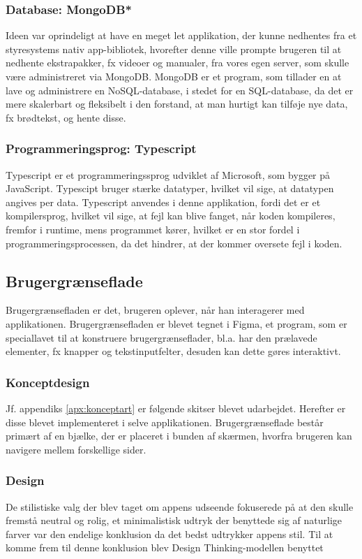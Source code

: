 \subsubsection{Database: MongoDB*}
Ideen var oprindeligt at have en meget let applikation, der kunne nedhentes fra et styresystems nativ app-bibliotek, hvorefter denne ville prompte brugeren til at nedhente ekstrapakker, fx videoer og manualer, fra vores egen server, som skulle være administreret via MongoDB. MongoDB er et program, som tillader en at lave og administrere en NoSQL-database, i stedet for en SQL-database, da det er mere skalerbart og fleksibelt i den forstand, at man hurtigt kan tilføje nye data, fx brødtekst, og hente disse. 
\subsubsection{Programmeringsprog: Typescript}
Typescript er et programmeringssprog udviklet af Microsoft, som bygger på JavaScript. Typescipt bruger stærke datatyper, hvilket vil sige, at datatypen angives per data. Typescript anvendes i denne applikation, fordi det er et kompilersprog, hvilket vil sige, at fejl kan blive fanget, når koden kompileres, fremfor i runtime, mens programmet kører, hvilket er en stor fordel i programmeringsprocessen, da det hindrer, at der kommer oversete fejl i koden.
\subsection{Brugergrænseflade}
Brugergrænsefladen er det, brugeren oplever, når han interagerer med applikationen. Brugergrænsefladen er blevet tegnet i Figma, et program, som er speciallavet til at konstruere brugergrænseflader, bl.a. har den prælavede elementer, fx knapper og tekstinputfelter, desuden kan dette gøres interaktivt. 
\subsubsection{Konceptdesign}
Jf. appendiks \ref{apx:konceptart} er følgende skitser blevet udarbejdet. Herefter er disse blevet implementeret i selve applikationen. Brugergrænseflade består primært af en bjælke, der er placeret i bunden af skærmen, hvorfra brugeren kan navigere mellem forskellige sider.
\subsubsection{Design}
De stilistiske valg der blev taget om appens udseende fokuserede på at den skulle fremstå neutral og rolig, et minimalistisk udtryk der benyttede sig af naturlige farver var den endelige konklusion da det bedst udtrykker appens stil. Til at komme frem til denne konklusion blev Design Thinking-modellen benyttet \cite{Design-grundbog}

